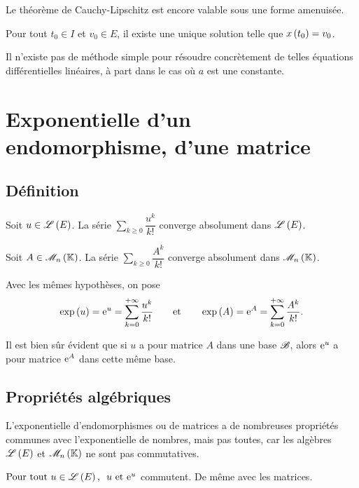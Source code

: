 Le théorème de Cauchy-Lipschitz est encore valable sous une forme amenuisée.

\begin{theo}
Pour tout \(t_0\in I\) et \(v_0\in E\), il existe une unique solution telle que \(x\left(t_0\right)=v_0\).
\end{theo}

\begin{rem}
Il n'existe pas de méthode simple pour résoudre concrètement de telles équations différentielles linéaires, à part dans le cas où \(a\) est une constante.
\end{rem}

\section{Exponentielle d'un endomorphisme, d'une matrice}

\subsection{Définition}

\begin{prop}
Soit \(u\in\mathscr{L}\left(E\right)\). La série \(\sum_{k\geq0}\dfrac{u^k}{k!}\) converge absolument dans \(\mathscr{L}\left(E\right)\).

Soit \(A\in\M{n}\). La série \(\sum_{k\geq0}\dfrac{A^k}{k!}\) converge absolument dans \(\M{n}\).
\end{prop}

\begin{defi}
Avec les mêmes hypothèses, on pose \[\exp\left(u\right)=\mathrm{e}^{u}=\sum_{k=0}^{+\infty}\dfrac{u^k}{k!}\qquad\text{et}\qquad\exp\left(A\right)=\mathrm{e}^{A}=\sum_{k=0}^{+\infty}\dfrac{A^k}{k!}.\]
\end{defi}

Il est bien sûr évident que si \(u\) a pour matrice \(A\) dans une base \(\mathscr{B}\), alors \(\mathrm{e}^{u}\) a pour matrice \(\mathrm{e}^{A}\) dans cette même base.

\subsection{Propriétés algébriques}

L'exponentielle d'endomorphismes ou de matrices a de nombreuses propriétés communes avec l'exponentielle de nombres, mais pas toutes, car les algèbres \(\mathscr{L}\left(E\right)\) et \(\M{n}\) ne sont pas commutatives.

\begin{prop}
\(\quantifs{\Tpt u\in\Lendo{E}}u\text{ et }\e{u}\) commutent. De même avec les matrices.
\end{prop}

